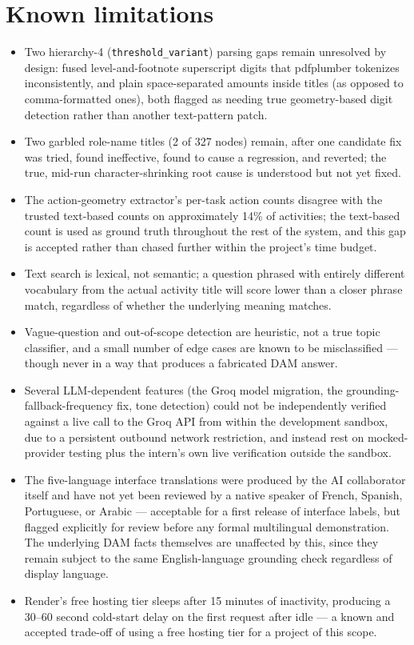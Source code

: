\section{Known limitations}
\begin{itemize}
\item Two hierarchy-4 (\texttt{threshold\_\allowbreak{}variant}) parsing gaps remain unresolved by design: fused level-and-footnote superscript digits that pdfplumber tokenizes inconsistently, and plain space-separated amounts inside titles (as opposed to comma-formatted ones), both flagged as needing true geometry-based digit detection rather than another text-pattern patch.
\item Two garbled role-name titles (2 of 327 nodes) remain, after one candidate fix was tried, found ineffective, found to cause a regression, and reverted; the true, mid-run character-shrinking root cause is understood but not yet fixed.
\item The action-geometry extractor's per-task action counts disagree with the trusted text-based counts on approximately 14\% of activities; the text-based count is used as ground truth throughout the rest of the system, and this gap is accepted rather than chased further within the project's time budget.
\item Text search is lexical, not semantic; a question phrased with entirely different vocabulary from the actual activity title will score lower than a closer phrase match, regardless of whether the underlying meaning matches.
\item Vague-question and out-of-scope detection are heuristic, not a true topic classifier, and a small number of edge cases are known to be misclassified — though never in a way that produces a fabricated DAM answer.
\item Several LLM-dependent features (the Groq model migration, the grounding-fallback-frequency fix, tone detection) could not be independently verified against a live call to the Groq API from within the development sandbox, due to a persistent outbound network restriction, and instead rest on mocked-provider testing plus the intern's own live verification outside the sandbox.
\item The five-language interface translations were produced by the AI collaborator itself and have not yet been reviewed by a native speaker of French, Spanish, Portuguese, or Arabic — acceptable for a first release of interface labels, but flagged explicitly for review before any formal multilingual demonstration. The underlying DAM facts themselves are unaffected by this, since they remain subject to the same English-language grounding check regardless of display language.
\item Render's free hosting tier sleeps after 15 minutes of inactivity, producing a 30–60 second cold-start delay on the first request after idle — a known and accepted trade-off of using a free hosting tier for a project of this scope.
\end{itemize}
